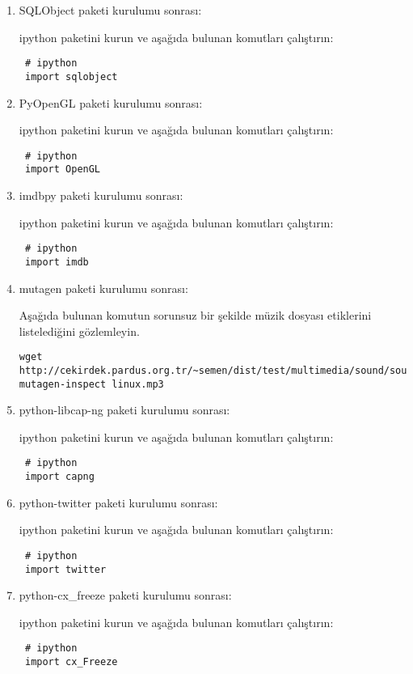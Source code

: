 \documentclass[a4paper,10pt]{article}
\begin{document}
\begin{enumerate}
\item SQLObject  paketi kurulumu sonrası:

ipython paketini kurun ve aşağıda bulunan komutları çalıştırın:
\begin{verbatim}
 # ipython
 import sqlobject
\end{verbatim}

\item PyOpenGL  paketi kurulumu sonrası:

ipython paketini kurun ve aşağıda bulunan komutları çalıştırın:
\begin{verbatim}
 # ipython
 import OpenGL
\end{verbatim}

\item imdbpy  paketi kurulumu sonrası:

ipython paketini kurun ve aşağıda bulunan komutları çalıştırın:
\begin{verbatim}
 # ipython
 import imdb
\end{verbatim}

\item mutagen  paketi kurulumu sonrası:

Aşağıda bulunan komutun sorunsuz bir şekilde müzik dosyası etiklerini listelediğini gözlemleyin.
\begin{verbatim}
wget http://cekirdek.pardus.org.tr/~semen/dist/test/multimedia/sound/sound/linux.mp3 
mutagen-inspect linux.mp3
\end{verbatim}


\item python-libcap-ng  paketi kurulumu sonrası:

ipython paketini kurun ve aşağıda bulunan komutları çalıştırın:
\begin{verbatim}
 # ipython
 import capng
\end{verbatim}

\item python-twitter paketi kurulumu sonrası:

ipython paketini kurun ve aşağıda bulunan komutları çalıştırın:
\begin{verbatim}
 # ipython
 import twitter
\end{verbatim}


\item python-cx\_freeze paketi kurulumu sonrası:

ipython paketini kurun ve aşağıda bulunan komutları çalıştırın:
\begin{verbatim}
 # ipython
 import cx_Freeze
\end{verbatim}


\end{enumerate}
\end{document}
